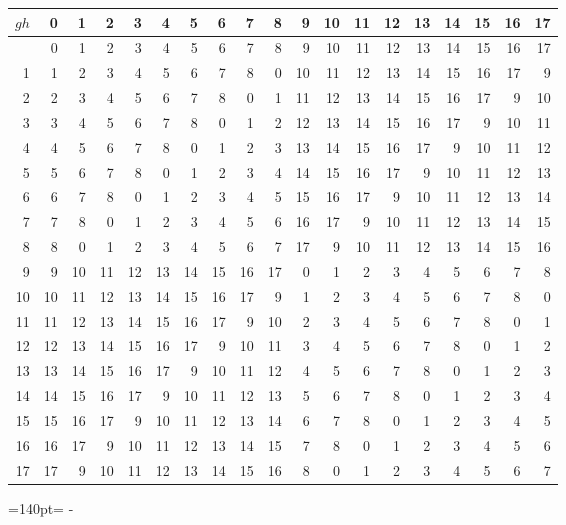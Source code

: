 \documentclass[10pt,a4paper]{article}
\newcommand{\needspace}[1]{\par\penalty-100\begingroup\dimen0=#1\relax\dimen2=\pagegoal
  \advance\dimen2-\pagetotal\ifdim\dimen0>\dimen2\relax\ifdim\dimen2>0pt\vfil\break\fi\fi
  \endgroup}
\numberwithin{equation}{section}
\begin{document}
{\normalsize\setlength{\tabcolsep}{0.1em}\setlength{\LTleft}{-8pt plus 1fill}\setlength{\LTright}{-8pt plus 1fill}\begin{longtable}{@{}r|rrrrrrrrrrrrrrrrrr@{}}\toprule
$gh$ & 0 & 1 & 2 & 3 & 4 & 5 & 6 & 7 & 8 & 9 & 10 & 11 & 12 & 13 & 14 & 15 & 16 & 17\\\midrule\endhead
\bottomrule\endfoot\endlastfoot
0 & 0 & 1 & 2 & 3 & 4 & 5 & 6 & 7 & 8 & 9 & 10 & 11 & 12 & 13 & 14 & 15 & 16 & 17\\*
1 & 1 & 2 & 3 & 4 & 5 & 6 & 7 & 8 & 0 & 10 & 11 & 12 & 13 & 14 & 15 & 16 & 17 & 9\\
2 & 2 & 3 & 4 & 5 & 6 & 7 & 8 & 0 & 1 & 11 & 12 & 13 & 14 & 15 & 16 & 17 & 9 & 10\\
3 & 3 & 4 & 5 & 6 & 7 & 8 & 0 & 1 & 2 & 12 & 13 & 14 & 15 & 16 & 17 & 9 & 10 & 11\\
4 & 4 & 5 & 6 & 7 & 8 & 0 & 1 & 2 & 3 & 13 & 14 & 15 & 16 & 17 & 9 & 10 & 11 & 12\\
5 & 5 & 6 & 7 & 8 & 0 & 1 & 2 & 3 & 4 & 14 & 15 & 16 & 17 & 9 & 10 & 11 & 12 & 13\\
6 & 6 & 7 & 8 & 0 & 1 & 2 & 3 & 4 & 5 & 15 & 16 & 17 & 9 & 10 & 11 & 12 & 13 & 14\\
7 & 7 & 8 & 0 & 1 & 2 & 3 & 4 & 5 & 6 & 16 & 17 & 9 & 10 & 11 & 12 & 13 & 14 & 15\\
8 & 8 & 0 & 1 & 2 & 3 & 4 & 5 & 6 & 7 & 17 & 9 & 10 & 11 & 12 & 13 & 14 & 15 & 16\\
9 & 9 & 10 & 11 & 12 & 13 & 14 & 15 & 16 & 17 & 0 & 1 & 2 & 3 & 4 & 5 & 6 & 7 & 8\\
10 & 10 & 11 & 12 & 13 & 14 & 15 & 16 & 17 & 9 & 1 & 2 & 3 & 4 & 5 & 6 & 7 & 8 & 0\\
11 & 11 & 12 & 13 & 14 & 15 & 16 & 17 & 9 & 10 & 2 & 3 & 4 & 5 & 6 & 7 & 8 & 0 & 1\\
12 & 12 & 13 & 14 & 15 & 16 & 17 & 9 & 10 & 11 & 3 & 4 & 5 & 6 & 7 & 8 & 0 & 1 & 2\\
13 & 13 & 14 & 15 & 16 & 17 & 9 & 10 & 11 & 12 & 4 & 5 & 6 & 7 & 8 & 0 & 1 & 2 & 3\\
14 & 14 & 15 & 16 & 17 & 9 & 10 & 11 & 12 & 13 & 5 & 6 & 7 & 8 & 0 & 1 & 2 & 3 & 4\\
15 & 15 & 16 & 17 & 9 & 10 & 11 & 12 & 13 & 14 & 6 & 7 & 8 & 0 & 1 & 2 & 3 & 4 & 5\\
16 & 16 & 17 & 9 & 10 & 11 & 12 & 13 & 14 & 15 & 7 & 8 & 0 & 1 & 2 & 3 & 4 & 5 & 6\\*
17 & 17 & 9 & 10 & 11 & 12 & 13 & 14 & 15 & 16 & 8 & 0 & 1 & 2 & 3 & 4 & 5 & 6 & 7\\
\bottomrule\end{longtable}}
\needspace{140pt}
\end{document}
